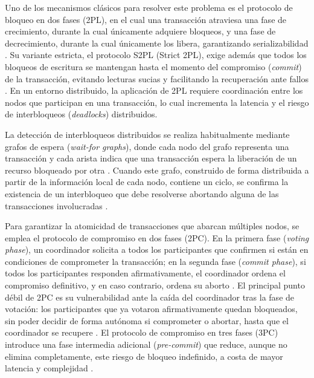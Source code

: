 \documentclass[12pt, a4paper]{article}
\begin{document}
Uno de los mecanismos clásicos para resolver este problema es el protocolo de bloqueo en dos fases (2PL), en el cual una transacción atraviesa una fase de crecimiento, durante la cual únicamente adquiere bloqueos, y una fase de decrecimiento, durante la cual únicamente los libera, garantizando serializabilidad \cite{ozsu2020principles}. Su variante estricta, el protocolo S2PL (Strict 2PL), exige además que todos los bloqueos de escritura se mantengan hasta el momento del compromiso (\textit{commit}) de la transacción, evitando lecturas sucias y facilitando la recuperación ante fallos \cite{ozsu2020principles}. En un entorno distribuido, la aplicación de 2PL requiere coordinación entre los nodos que participan en una transacción, lo cual incrementa la latencia y el riesgo de interbloqueos (\textit{deadlocks}) distribuidos.

La detección de interbloqueos distribuidos se realiza habitualmente mediante grafos de espera (\textit{wait-for graphs}), donde cada nodo del grafo representa una transacción y cada arista indica que una transacción espera la liberación de un recurso bloqueado por otra \cite{ozsu2020principles}. Cuando este grafo, construido de forma distribuida a partir de la información local de cada nodo, contiene un ciclo, se confirma la existencia de un interbloqueo que debe resolverse abortando alguna de las transacciones involucradas \cite{steen2023distributed}.

Para garantizar la atomicidad de transacciones que abarcan múltiples nodos, se emplea el protocolo de compromiso en dos fases (2PC). En la primera fase (\textit{voting phase}), un coordinador solicita a todos los participantes que confirmen si están en condiciones de comprometer la transacción; en la segunda fase (\textit{commit phase}), si todos los participantes responden afirmativamente, el coordinador ordena el compromiso definitivo, y en caso contrario, ordena su aborto \cite{ozsu2020principles}. El principal punto débil de 2PC es su vulnerabilidad ante la caída del coordinador tras la fase de votación: los participantes que ya votaron afirmativamente quedan bloqueados, sin poder decidir de forma autónoma si comprometer o abortar, hasta que el coordinador se recupere \cite{ozsu2020principles}. El protocolo de compromiso en tres fases (3PC) introduce una fase intermedia adicional (\textit{pre-commit}) que reduce, aunque no elimina completamente, este riesgo de bloqueo indefinido, a costa de mayor latencia y complejidad \cite{steen2023distributed}.
\end{document}
